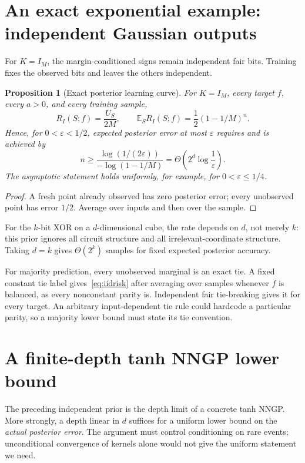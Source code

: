\documentclass[11pt]{article}
\newtheorem{proposition}[theorem]{Proposition}
\theoremstyle{remark}\newtheorem{remark}[theorem]{Remark}
\newcommand{\E}{\mathbb E}
\begin{document}
\section{An exact exponential example: independent Gaussian outputs}\label{sec:independent}
For $K=I_M$, the margin-conditioned signs remain independent fair bits. Training fixes the observed bits and leaves the others independent.
\begin{proposition}[Exact posterior learning curve]\label{prop:independent}
For $K=I_M$, every target $f$, every $a>0$, and every training sample,
\begin{equation}\label{eq:iidrisk}
 R_I(S;f)=\frac{U_S}{2M},
 \qquad
 \E_S R_I(S;f)=\frac12(1-1/M)^n.
\end{equation}
Hence, for $0<\varepsilon<1/2$, expected posterior error at most $\varepsilon$ requires and is achieved by
\begin{equation}\label{eq:iidcomplexity}
 n\ge
 \frac{\log(1/(2\varepsilon))}{-\log(1-1/M)}
 =\Theta\!\left(2^d\log\frac1\varepsilon\right).
\end{equation}
The asymptotic statement holds uniformly, for example, for $0<\varepsilon\le1/4$.
\end{proposition}
\begin{proof}
A fresh point already observed has zero posterior error; every unobserved point has error $1/2$. Average over inputs and then over the sample.
\end{proof}
For the $k$-bit XOR on a $d$-dimensional cube, the rate depends on $d$, not merely $k$: this prior ignores all circuit structure and all irrelevant-coordinate structure. Taking $d=k$ gives $\Theta(2^k)$ samples for fixed expected posterior accuracy.

For majority prediction, every unobserved marginal is an exact tie. A fixed constant tie label gives~\eqref{eq:iidrisk} after averaging over samples whenever $f$ is balanced, as every nonconstant parity is. Independent fair tie-breaking gives it for every target. An arbitrary input-dependent tie rule could hardcode a particular parity, so a majority lower bound must state its tie convention.

\section{A finite-depth tanh NNGP lower bound}\label{sec:tanh}
The preceding independent prior is the depth limit of a concrete tanh NNGP. More strongly, a depth linear in $d$ suffices for a uniform lower bound on the \emph{actual posterior error}. The argument must control conditioning on rare events; unconditional convergence of kernels alone would not give the uniform statement we need.
\end{document}
